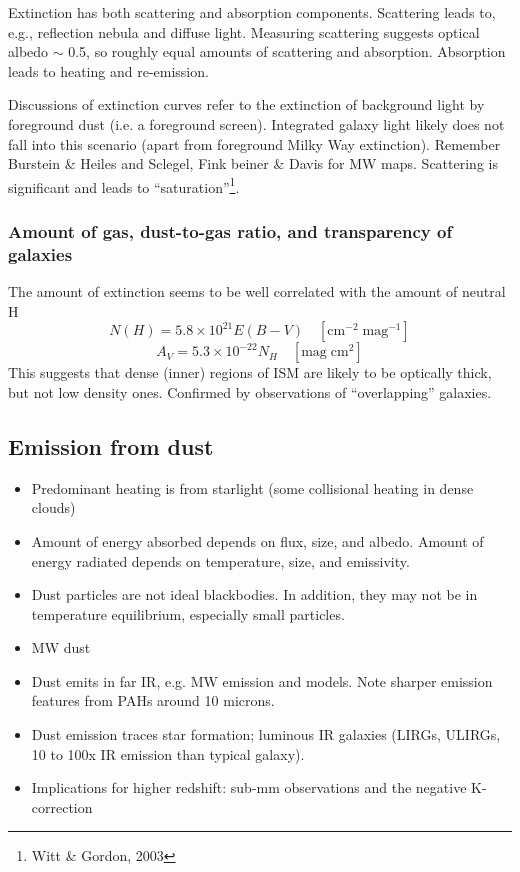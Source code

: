 \documentclass{article}
\begin{document}
Extinction has both scattering and absorption components. Scattering
leads to, e.g., reflection nebula and diffuse light. Measuring scattering
suggests optical albedo $\sim$ 0.5, so roughly equal amounts of scattering
and absorption. Absorption leads to heating and re-emission.

Discussions of extinction curves refer to the extinction of background light by
foreground dust (i.e. a foreground screen). Integrated galaxy light likely does
not fall into this scenario (apart from foreground Milky Way extinction).
Remember Burstein \& Heiles and Sclegel, Fink beiner \& Davis for MW maps.
Scattering is significant and leads to ``saturation''\footnote{Witt \&
Gordon, 2003}.

\subsubsection{Amount of gas, dust-to-gas ratio, and transparency of galaxies}
The amount of extinction seems to be well correlated with the amount of
neutral H
\[
    N(H) = 5.8\times10^{21}E(B-V)\quad
    \left[\mathrm{cm}^{-2}\;\mathrm{mag}^{-1}\right]
\]\[
    A_{V} = 5.3\times10^{-22}N_{H}\quad
    \left[\mathrm{mag}\;\mathrm{cm}^{2}\right]
\]
This suggests that dense (inner) regions of ISM are likely to be optically
thick, but not low density ones. Confirmed by observations of ``overlapping''
galaxies.

\subsection{Emission from dust}
\begin{itemize}
    \item Predominant heating is from starlight (some collisional
        heating in dense clouds)
    \item Amount of energy absorbed depends on flux, size, and albedo.
        Amount of energy radiated depends on temperature, size, and emissivity.
    \item Dust particles are not ideal blackbodies. In addition, they may not
        be in temperature equilibrium, especially small particles.
    \item MW dust
    \item Dust emits in far IR, e.g. MW emission and models. Note sharper
        emission features from PAHs around 10 microns.
    \item Dust emission traces star formation; luminous IR galaxies
        (LIRGs, ULIRGs, 10 to 100x IR emission than typical galaxy).
    \item Implications for higher redshift: sub-mm observations and
        the negative K-correction
\end{itemize}
\end{document}

